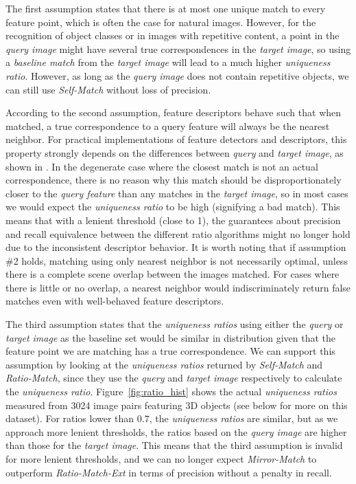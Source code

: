 \documentclass[review]{elsarticle}
\begin{document}
The first assumption states that there is at most one unique match to every feature point, which is often the case for natural images. However, for the recognition of object classes or in images with repetitive content, a point in the \emph{query image} might have several true correspondences in the \emph{target image}, so using a \emph{baseline match} from the \emph{target image} will lead to a much higher \emph{uniqueness ratio}. However, as long as the \emph{query image} does not contain repetitive objects, we can still use \emph{Self-Match} without loss of precision.

According to the second assumption, feature descriptors behave such that when matched, a true correspondence to a query feature will always be the nearest neighbor. For practical implementations of feature detectors and descriptors, this property strongly depends on the differences between \emph{query} and \emph{target image}, as shown in  \cite{mikolajczyk2005performance,tuytelaars2008local}. In the degenerate case where the closest match is not an actual correspondence, there is no reason why this match should be disproportionately closer to the \emph{query feature} than any matches in the \emph{target image}, so in most cases we would expect the \emph{uniqueness ratio} to be high (signifying a bad match). This means that with a lenient threshold (close to 1), the guarantees about precision and recall equivalence between the different ratio algorithms might no longer hold due to the inconsistent descriptor behavior. It is worth noting that if assumption \#2 holds, matching using only nearest neighbor is not necessarily optimal, unless there is a complete scene overlap between the images matched. For cases where there is little or no overlap, a nearest neighbor would indiscriminately return false matches even with well-behaved feature descriptors.

The third assumption states that the \emph{uniqueness ratios} using either the \emph{query} or \emph{target image} as the baseline set would be similar in distribution given that the feature point we are matching has a true correspondence. We can support this assumption by looking at the \emph{uniqueness ratios} returned by \emph{Self-Match} and \emph{Ratio-Match}, since they use the \emph{query} and \emph{target image} respectively to calculate the \emph{uniqueness ratio}.  Figure~\ref{fig:ratio_hist} shows the actual \emph{uniqueness ratios} measured from 3024 image pairs featuring 3D objects (see below for more on this dataset).  For ratios lower than $0.7$, the \emph{uniqueness ratios} are similar, but as we approach more lenient thresholds, the ratios based on the \emph{query image} are higher than those for the \emph{target image}. This means that the third assumption is invalid for more lenient thresholds, and we can no longer expect \emph{Mirror-Match} to outperform \emph{Ratio-Match-Ext} in terms of precision without a penalty in recall.
\end{document}
